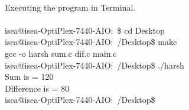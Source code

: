 \documentclass[12pt, a4paper, twoside]{report}
\begin{document}
    \\
    \large
    {Executing the program in Terminal.\\ \\
    isea@isea-OptiPlex-7440-AIO:~\$ cd Desktop\\
    isea@isea-OptiPlex-7440-AIO:~/Desktop\$ make\\
    gcc -o harsh sum.c dif.c main.c\\
    isea@isea-OptiPlex-7440-AIO:~/Desktop\$ ./harsh\\
    Sum is = 120\\
    Difference is = 80\\
    isea@isea-OptiPlex-7440-AIO:~/Desktop\$ \\    
    }
    \\
    \\
\end{document}
